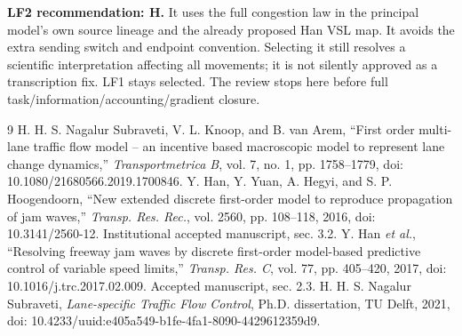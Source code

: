\documentclass[10pt,a4paper]{article}
\begin{document}
\textbf{LF2 recommendation: H.} It uses the full congestion law in the
principal model's own source lineage and the already proposed Han VSL map.
It avoids the extra sending switch and endpoint convention. Selecting it
still resolves a scientific interpretation affecting all movements; it is
not silently approved as a transcription fix. LF1 stays selected. The
review stops here before full task/information/accounting/gradient closure.

\begin{thebibliography}{9}\setlength{\itemsep}{0pt}
 H. H. S. Nagalur Subraveti, V. L. Knoop, and B. van Arem,
``First order multi-lane traffic flow model -- an incentive based macroscopic
model to represent lane change dynamics,'' \emph{Transportmetrica B},
vol. 7, no. 1, pp. 1758--1779, doi: 10.1080/21680566.2019.1700846.
 Y. Han, Y. Yuan, A. Hegyi, and S. P. Hoogendoorn,
``New extended discrete first-order model to reproduce propagation of jam
waves,'' \emph{Transp. Res. Rec.}, vol. 2560, pp. 108--118, 2016,
doi: 10.3141/2560-12. Institutional accepted manuscript, sec. 3.2.
 Y. Han \emph{et al.}, ``Resolving freeway jam waves by
discrete first-order model-based predictive control of variable speed limits,''
\emph{Transp. Res. C}, vol. 77, pp. 405--420, 2017,
doi: 10.1016/j.trc.2017.02.009. Accepted manuscript, sec. 2.3.
 H. H. S. Nagalur Subraveti, \emph{Lane-specific Traffic
Flow Control}, Ph.D. dissertation, TU Delft, 2021,
doi: 10.4233/uuid:e405a549-b1fe-4fa1-8090-4429612359d9.
\end{thebibliography}
\end{document}
